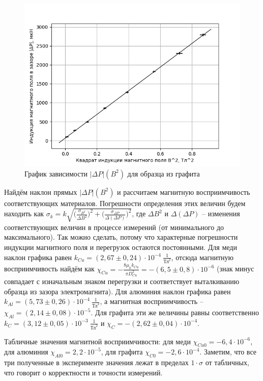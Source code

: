 \documentclass[a4paper,12pt]{article}
\begin{document}
\begin{figure}[h]
	\centering
	\includegraphics[scale = 0.8]{Plot_Carbon}
	\caption{График зависимости $\left|\Delta P\right|(B^2)$ для образца из графита} \label{Графит}
\end{figure} 

Найдём наклон прямых $\left|\Delta P\right|(B^2)$ и рассчитаем магнитную восприимчивость соответствующих материалов. Погрешности определения этих величин будем находить как $\sigma_k=k\sqrt{\big(\frac{\sigma_{B^2}}{\Delta B^2}\big)^2+\big(\frac{\sigma_{\Delta P}}{\Delta\left(\Delta P\right)}\big)^2}$, где $\Delta B^2$ и $\Delta\left(\Delta P\right)$ -- изменения соответствующих величин в процессе измерений (от минимального до максимального). Так можно сделать, потому что характерные погрешности индукции магнитного поля и перегрузок остаются постоянными. Для меди наклон графика равен $k_{Cu}=\left(2,67\pm0,24\right)\cdot10^{-4}~\frac{1}{\text{Тл}^2}$, отсюда магнитную восприимчивость найдём как $\chi_{Cu}=-\frac{8\mu_0k_{Cu}}{\pi D_{Cu}^2}=-\left(6,5\pm0,8\right)\cdot10^{-6}$ (знак минус совпадает с изначальным знаком перегрузки и соответствует выталкиванию образца из зазора электромагнита). Для алюминия наклон графика равен $k_{Al}=\left(5,73\pm0,26\right)\cdot10^{-4}~\frac{1}{\text{Тл}^2}$, а магнитная восприимчивость -- $\chi_{Al}=\left(2,14\pm0,08\right)\cdot10^{-5}$. Для графита эти же величины равны соответственно $k_C=\left(3,12\pm0,05\right)\cdot10^{-3}~\frac{1}{\text{Тл}^2}$ и $\chi_C=-\left(2,62\pm0,04\right)\cdot10^{-4}$.

Табличные значения магнитной восприимчивости: для меди $\chi_{Cu0}=-6,4\cdot10^{-6}$, для алюминия $\chi_{Al0}=2,2\cdot10^{-5}$, для графита $\chi_{C0}=-2,6\cdot10^{-4}$. Заметим, что все три полученные в эксперименте значения лежат в пределах $1\cdot\sigma$ от табличных, что говорит о корректности и точности измерений.
\end{document}
